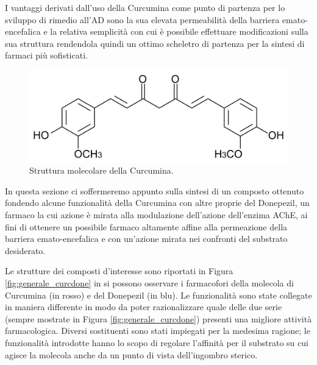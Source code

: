 \documentclass[a4paper, 12pt]{article}
\begin{document}
I vantaggi derivati dall'uso della Curcumina come punto di partenza per lo sviluppo di rimedio all'AD sono la sua elevata permeabilità della barriera emato-encefalica e la relativa semplicità con cui è possibile effettuare modificazioni sulla sua struttura rendendola quindi un ottimo scheletro di partenza per la sintesi di farmaci più sofisticati. \cite{jabir_cholinesterase_2018, jiang_traditional_2017}

\begin{figure}[H]
	\centering
	\includegraphics[width=.6\linewidth]{immagini/curcumina.png}
	\caption{Struttura molecolare della Curcumina.}
	\label{fig:curcumina}
\end{figure}

In questa sezione ci soffermeremo appunto sulla sintesi di un composto ottenuto fondendo alcune funzionalità della Curcumina con altre proprie del Donepezil, un farmaco la cui azione è mirata alla modulazione dell'azione dell'enzima AChE, ai fini di ottenere un possibile farmaco altamente affine alla permeazione della barriera emato-encefalica e con un'azione mirata nei confronti del substrato desiderato.

Le strutture dei composti d'interesse sono riportati in Figura \ref{fig:generale_curcdone} in si possono osservare i farmacofori della molecola di Curcumina (in rosso) e del Donepezil (in blu). Le funzionalità sono state collegate in maniera differente in modo da poter razionalizzare quale delle due serie (sempre mostrate in Figura \ref{fig:generale_curcdone}) presenti una migliore attività farmacologica. Diversi sostituenti sono stati impiegati per la medesima ragione; le funzionalità introdotte hanno lo scopo di regolare l'affinità per il substrato su cui agisce la molecola anche da un punto di vista dell'ingombro sterico.
\end{document}
